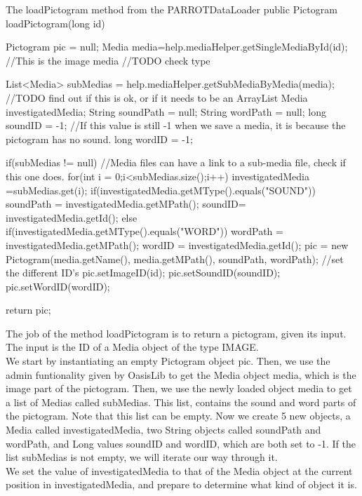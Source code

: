 \begin{source}[{lp}]{The loadPictogram method from the PARROTDataLoader}
	public Pictogram loadPictogram(long id)
	{
		Pictogram pic = null;
		Media media=help.mediaHelper.getSingleMediaById(id); //This is the image media //TODO check type

		List<Media> subMedias =	help.mediaHelper.getSubMediaByMedia(media); //TODO find out if this is ok, or if it needs to be an ArrayList
		Media investigatedMedia;
		String soundPath = null;
		String wordPath = null;
		long soundID = -1; //If this value is still -1 when we save a media, it is because the pictogram has no sound.
		long wordID = -1;

		if(subMedias != null)	//Media files can have a link to a sub-media file, check if this one does.
		{
			for(int i = 0;i<subMedias.size();i++) 		
			{
				investigatedMedia =subMedias.get(i);
				if(investigatedMedia.getMType().equals("SOUND"))
				{
					soundPath = investigatedMedia.getMPath();
					soundID= investigatedMedia.getId();
				}
				else if(investigatedMedia.getMType().equals("WORD"))
				{
					wordPath = investigatedMedia.getMPath();
					wordID = investigatedMedia.getId();
				}
			}
		}
		pic = new Pictogram(media.getName(), media.getMPath(), soundPath, wordPath);
		//set the different ID's
		pic.setImageID(id);
		pic.setSoundID(soundID);
		pic.setWordID(wordID);

		return pic;
	}

\end{source}
The job of the method loadPictogram is to return a pictogram, given its input. The input is the ID of a Media object of the type IMAGE.\\
We start by instantiating an empty Pictogram object pic.\newline
Then, we use the admin funtionality given by OasisLib to get the Media object media, which is the image part of the pictogram.
Then, we use the newly loaded object media to get a list of Medias called subMedias.
This list, contains the sound and word parts of the pictogram.
Note that this list can be empty.\newline
Now we create 5 new objects, a Media called investigatedMedia, two String objects called soundPath and wordPath, and Long values soundID and wordID, which are both set to -1.
If the list subMedias is not empty, we will iterate our way through it.\\
We set the value of investigatedMedia to that of the Media object at the current position in investigatedMedia, and prepare to determine what kind of object it is.
